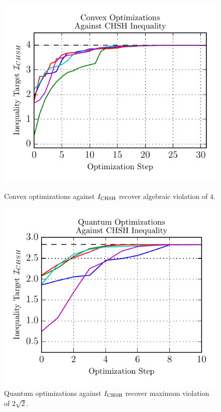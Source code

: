 \documentclass[aps, 10pt, english, twoside, pra, nofootinbib, longbibliography]{revtex4-1}
\theoremstyle{plain}
\theoremstyle{definition}
\theoremstyle{remark}
\begin{document}
    \begin{figure}
    \newlength\figureheight
    \newlength\figurewidth
    \setlength\figureheight{2.7in}
    \setlength{}
    \begin{center}
        \begin{minipage}[b]{.48\textwidth}
            \centering
            \includegraphics{../figures/CHSH_convex.pdf}
            \caption{Convex optimizations against $I_\text{CHSH}$ recover algebraic violation of $4$.}
            \label{fig:CHSH_convex}
        \end{minipage}\hspace{0.04\textwidth}%
        \begin{minipage}[b]{.48\textwidth}
            \centering
            \includegraphics{../figures/CHSH_quantum.pdf}
            \caption{Quantum optimizations against $I_\text{CHSH}$ recover maximum violation of $2\sqrt{2}$.}
            \label{fig:CHSH_quantum}
        \end{minipage}
    \end{center}
    \end{figure}
\end{document}
